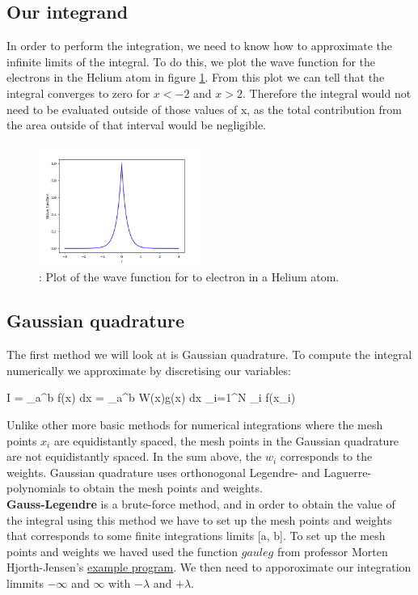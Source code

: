 \documentclass{article}
\begin{document}
	\subsection*{Our integrand}
		In order to perform the integration, we need to know how to approximate the infinite limits of the integral. To do this, we plot the wave function for the electrons in the Helium atom in figure \ref{fig:wavefunc}. From this plot we can tell that the integral converges to zero for $x < -2$ and $ x > 2$. Therefore the integral would not need to be evaluated outside of those values of x, as the total contribution from the area outside of that interval would be negligible.
		\begin{figure}[hbt]
		\begin{center}
				\includegraphics[width=200px]{Wave_func.png}
				\caption{: Plot of the wave function for to electron in a Helium atom.}
				\label{fig:wavefunc}
		\end{center}
		\end{figure}

	\subsection*{Gaussian quadrature}
		The first method we will look at is Gaussian quadrature. To compute the integral numerically we approximate by discretising our variables:
		\begin{flalign*}
			I = \int_{a}^{b} f(x) dx = \int_{a}^{b} W(x)g(x) dx \approx \sum_{i=1}^{N} \omega_i f(x_i)
		\end{flalign*}

		Unlike other more basic methods for numerical integrations where the mesh points $x_i$ are equidistantly spaced, the mesh points in the Gaussian quadrature are not equidistantly spaced. In the sum above, the $w_i$ corresponds to the weights. Gaussian quadrature uses orthonogonal Legendre- and Laguerre-polynomials to obtain the mesh points and weights.\\

		\textbf{Gauss-Legendre} is a brute-force method, and in order to obtain the value of the integral using this method we have to set up the mesh points and weights that corresponds to some finite integrations limits [a, b]. To set up the mesh points and weights we haved used the function $gauleg$ from professor Morten Hjorth-Jensen's \href{https://github.com/CompPhysics/ComputationalPhysics/blob/master/doc/Projects/2019/Project3/CodeExamples/exampleprogram.cpp}{example program}. We then need to apporoximate our integration limmits $-\infty$ and $\infty$ with $-\lambda$ and $+\lambda$.\\
\end{document}
